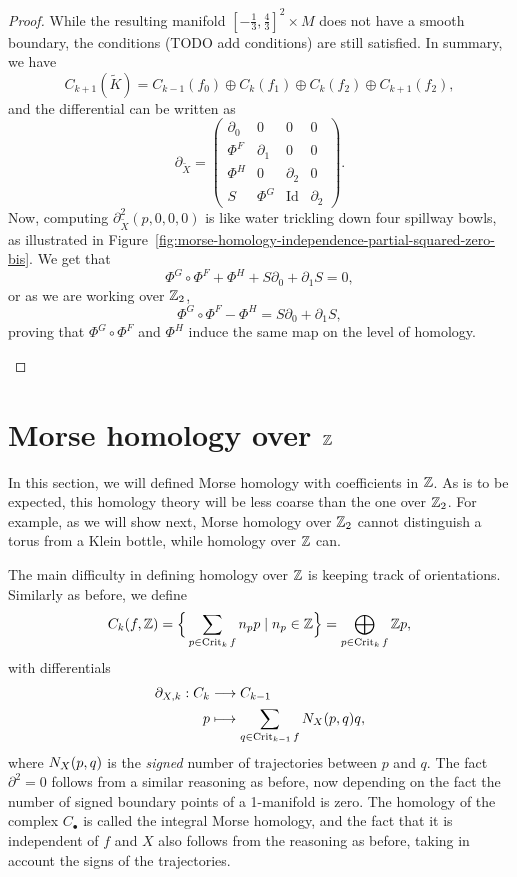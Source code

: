 \begin{proof}
While the resulting manifold $[-\frac{1}{3}, \frac{4}{3}]^2 \times M$ does not have a smooth boundary, the conditions (TODO add conditions) are still satisfied.
In summary, we have
\[
    C_{k+1}(\tilde{K}) = C_{k-1}(f_0) \oplus C_k(f_1) \oplus C_k(f_2) \oplus C_{k+1}(f_2)
,\] 
and the differential can be written as
\[
\partial_{\tilde{X}} = \begin{pmatrix}
    \partial_0 & 0 & 0 & 0\\
    \Phi^{F} &\partial_1 & 0 & 0 \\
    \Phi^{H} & 0 & \partial_2 & 0 \\
    S & \Phi^{G} & \operatorname{Id} & \partial_2
\end{pmatrix}
.\] 
Now, computing $\partial_{\tilde{X}}^2(p, 0, 0, 0)$ is like water trickling down four spillway bowls, as illustrated in Figure~\ref{fig:morse-homology-independence-partial-squared-zero-bis}. We get that
\[
\Phi^{G}  \circ  \Phi^{F} + \Phi^{H} + S \partial_0 + \partial_1 S = 0
,\] 
or as we are working over $\mathbb{Z}_2$,
\[
    \Phi^{G}  \circ \Phi^{F} - \Phi^{H} = S \partial_0 + \partial_1 S
,\] 
proving that $\Phi^{G}  \circ \Phi^{F}$ and $\Phi^{H}$ induce the same map on the level of homology.

\begin{figure*}
    \centering
    \caption{TODO morse homology independence partial squared zero bis}
    \label{fig:morse-homology-independence-partial-squared-zero-bis}
\end{figure*}
\end{proof}


\section{Morse homology over $\mathbb{Z}$}
In this section, we will defined Morse homology with coefficients in $\mathbb{Z}$.
As is to be expected, this homology theory will be less coarse than the one over $\mathbb{Z}_2$. For example, as we will show next, Morse homology over $\mathbb{Z}_2$ cannot distinguish a torus from a Klein bottle, while homology over $\mathbb{Z}$ can.

The main difficulty in defining homology over $\mathbb{Z}$ is keeping track of orientations.
Similarly as before, we define
    \[
        C_k(f, \mathbb{Z}) = \Big\{ \sum_{p \in \operatorname{Crit}_k f} n_p p  \mid n_p \in \mathbb{Z} \Big\}  = \bigoplus_{p \in \operatorname{Crit}_k f} \mathbb{Z} p
    ,\] 
    with differentials
    \begin{align*}
        \partial_{X, k}: C_k &\longrightarrow C_{k-1} \\
        p &\longmapsto \sum_{q \in \operatorname{Crit}_{k-1} f} N_{X}(p, q) q
    ,\end{align*}
    where $N_{X}(p, q)$ is the \emph{signed} number of trajectories between  $p$ and $q$.
    The fact $\partial^2 = 0$ follows from a similar reasoning as before, now depending on the fact the number of signed boundary points of a 1-manifold is zero.
    The homology of the complex $C_\bullet$ is called the integral Morse homology, and the fact that it is independent of $f$ and $X$ also follows from the reasoning as before, taking in account the signs of the trajectories.

